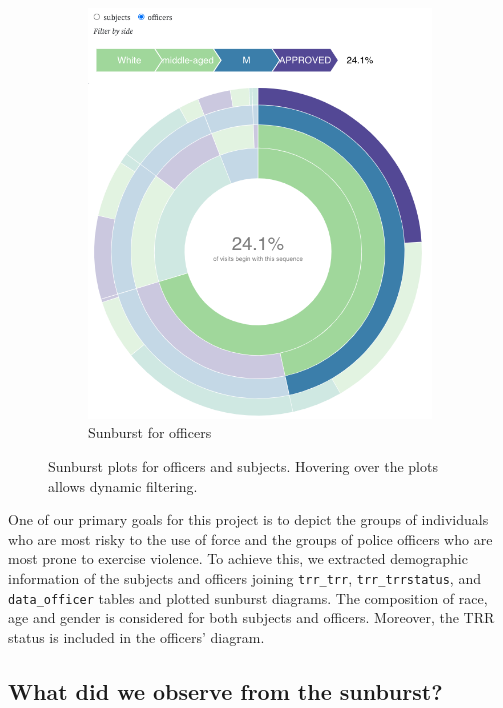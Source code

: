 \documentclass[10pt]{article}
\begin{document}
\begin{figure}
\begin{subfigure}{0.5\textwidth}
        \includegraphics[width=\textwidth]{sunburst-officer}
        \caption{Sunburst for officers}
        \label{sunburst-officer}
    \end{subfigure}
\caption{Sunburst plots for officers and subjects. Hovering over the plots allows dynamic filtering.}
\end{figure}

One of our primary goals for this project is to depict the groups of individuals who are most risky to the use of force and the groups of police officers who are most prone to exercise violence. To achieve this, we extracted demographic information of the subjects and officers joining \texttt{trr\_trr}, \texttt{trr\_trrstatus}, and \texttt{data\_officer} tables and plotted sunburst diagrams. The composition of race, age and gender is considered for both subjects and officers. Moreover, the TRR status is included in the officers' diagram.

\subsection{What did we observe from the sunburst?}
\end{document}
